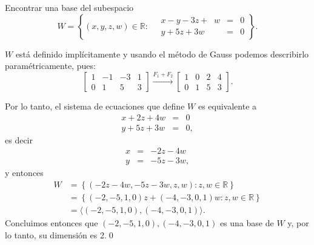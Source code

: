 \documentclass[handout]{beamer} %
\begin{document}
\begin{frame}
         
    \begin{ejemplo}
        Encontrar una base del subespacio 
        $$
        W = \left\{(x,y,z,w) \in \mathbb{R}: \quad\begin{array}{rcl}
        x-y -3z +\;\;w &=& 0 \\ y +5z +3w &=& 0
        \end{array} \right\}.
        $$
    \end{ejemplo}\pause
    \begin{solucion}\pause
        $W$  está definido implícitamente y usando el método de Gauss podemos describirlo paramétricamente, pues:
        \begin{equation*}
        \begin{bmatrix}1&-1&-3&1 \\ 0&1&5&3  \end{bmatrix}
        \stackrel{F_1+F_2}{\longrightarrow} 
        \begin{bmatrix}1&0&2&4 \\ 0&1&5&3  \end{bmatrix}.
        \end{equation*}
    \end{solucion}
\end{frame}


\begin{frame}
    Por lo tanto, el sistema de ecuaciones que define $W$ es equivalente a 
    \begin{equation*}
    \begin{array}{rcl}
    x  +2z +4w &=& 0 \\ y +5z +3w &=& 0,
    \end{array}
    \end{equation*}
    es decir 
    \begin{equation*}
    \begin{array}{rcl}
    x  &=& -2z - 4w  \\ y &=& -5z -3w ,
    \end{array}
    \end{equation*}
    y entonces
    \begin{align*}
    W &= \left\{(-2z -4w,-5z -3w,z,w) : z,w\in \mathbb{R} \right\} \\
    &= \left\{(-2,-5,1,0)z+(-4, -3,0,1)w : z,w\in \mathbb{R} \right\}\\
    &= \langle (-2,-5,1,0),(-4, -3,0,1)\rangle.
    \end{align*}
    Concluimos entonces que $(-2,-5,1,0),(-4, -3,0,1)$  es una base de $W$ y, por lo tanto,  su dimensión es 2.\qed
\end{frame}
\end{document}
